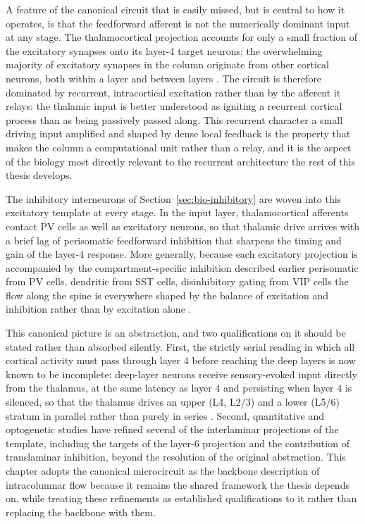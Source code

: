 A feature of the canonical circuit that is easily missed, but is central to how it operates, is that the feedforward afferent is not the numerically dominant input at any stage. The thalamocortical projection accounts for only a small fraction of the excitatory synapses onto its layer-4 target neurons; the overwhelming majority of excitatory synapses in the column originate from other cortical neurons, both within a layer and between layers \parencite{douglas2004}. The circuit is therefore dominated by recurrent, intracortical excitation rather than by the afferent it relays: the thalamic input is better understood as igniting a recurrent cortical process than as being passively passed along. This recurrent character  a small driving input amplified and shaped by dense local feedback  is the property that makes the column a computational unit rather than a relay, and it is the aspect of the biology most directly relevant to the recurrent architecture the rest of this thesis develops.

The inhibitory interneurons of Section~\ref{sec:bio-inhibitory} are woven into this excitatory template at every stage. In the input layer, thalamocortical afferents contact PV cells as well as excitatory neurons, so that thalamic drive arrives with a brief lag of perisomatic feedforward inhibition that sharpens the timing and gain of the layer-4 response. More generally, because each excitatory projection is accompanied by the compartment-specific inhibition described earlier perisomatic from PV cells, dendritic from SST cells, disinhibitory gating from VIP cells the flow along the spine is everywhere shaped by the balance of excitation and inhibition rather than by excitation alone \parencite{tremblay2016}.

This canonical picture is an abstraction, and two qualifications on it should be stated rather than absorbed silently. First, the strictly serial reading in which all cortical activity must pass through layer 4 before reaching the deep layers is now known to be incomplete: deep-layer neurons receive sensory-evoked input directly from the thalamus, at the same latency as layer 4 and persisting when layer 4 is silenced, so that the thalamus drives an upper (L4, L2/3) and a lower (L5/6) stratum in parallel rather than purely in series \parencite{constantinople2013}. Second, quantitative and optogenetic studies have refined several of the interlaminar projections of the template, including the targets of the layer-6 projection and the contribution of translaminar inhibition, beyond the resolution of the original abstraction. This chapter adopts the canonical microcircuit as the backbone description of intracolumnar flow because it remains the shared framework the thesis depends on, while treating these refinements as established qualifications to it rather than replacing the backbone with them.


